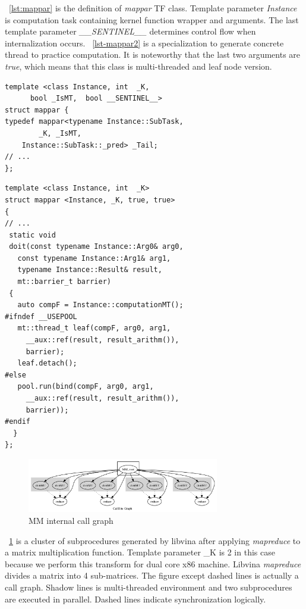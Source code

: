 \documentclass[10pt, conference, compsocconf]{IEEEtran}
\begin{document}
~\ref{lst:mappar} is the definition of \emph{mappar} TF class. Template parameter \emph{Instance} is computation task containing kernel function wrapper and arguments. The last template parameter \emph{\_\_SENTINEL\_\_} determines control flow when internalization occurs. ~\ref{lst-mappar2} is a specialization to generate concrete thread to practice computation. It is noteworthy that the last two arguments are \emph{true}, which means that this class is multi-threaded and leaf node version. 

\makebox[3.1\width]{\hrulefill}
\begin{verbatim}
template <class Instance, int  _K,
	  bool _IsMT,  bool __SENTINEL__>
struct mappar {
typedef mappar<typename Instance::SubTask, 
        _K, _IsMT, 
	Instance::SubTask::_pred> _Tail;
// ...
};
\end{verbatim}
\begin{center}
\label{lst:mappar}
\end{center}

\makebox[3.1\width]{\hrulefill}
\begin{verbatim}
template <class Instance, int  _K>
struct mappar <Instance, _K, true, true> 
{
// ...
 static void 
 doit(const typename Instance::Arg0& arg0, 
   const typename Instance::Arg1& arg1,
   typename Instance::Result& result,
   mt::barrier_t barrier)
 {
   auto compF = Instance::computationMT();
#ifndef __USEPOOL
   mt::thread_t leaf(compF, arg0, arg1, 
     __aux::ref(result, result_arithm()), 
     barrier);
   leaf.detach();
#else
   pool.run(bind(compF, arg0, arg1, 
     __aux::ref(result, result_arithm()), 
     barrier));
#endif
  }
};
\end{verbatim}
\begin{center}
\label{lst:mappar2}
\end{center}

\begin{figure}
\centering
\includegraphics[width=3.3in]{test_matrix}
\caption{MM internal call graph}
\label{fig:mm}
\end{figure}

~\ref{fig:mm} is a cluster of subprocedures generated by libvina after applying \emph{mapreduce} to a matrix multiplication function. Template parameter \_K is 2 in this case because we perform this transform for dual core x86 machine. Libvina \emph{mapreduce} divides a matrix into 4 sub-matrices. The figure except dashed lines is actually a call graph. Shadow lines is multi-threaded environment and two subprocedures are executed in parallel. Dashed lines indicate synchronization logically. 
\end{document}
